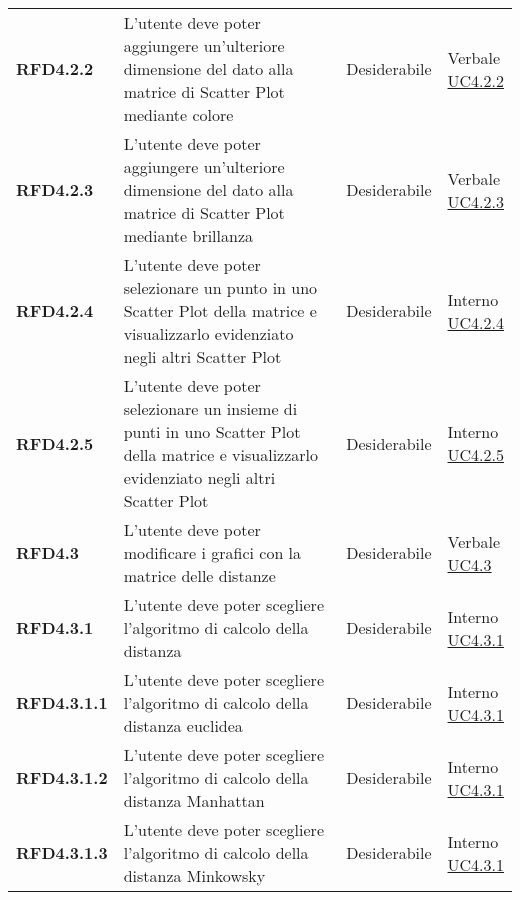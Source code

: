 \begin{longtable}[H]{| >{\raggedright\bfseries}m{20mm} | >{\raggedright}m{90mm} | >{\centering}m{25mm} | >{\centering\arraybackslash}m{30mm}|}
    RFD4.2.2
    & L'utente deve poter aggiungere un'ulteriore dimensione del dato alla matrice di Scatter Plot mediante colore
    & Desiderabile
    & \makecell{ Verbale \\ \hyperref[par:uc4.2.2]{UC4.2.2} }\\

    RFD4.2.3
    & L'utente deve poter aggiungere un'ulteriore dimensione del dato alla matrice di Scatter Plot mediante brillanza
    & Desiderabile
    & \makecell{ Verbale \\ \hyperref[par:uc4.2.3]{UC4.2.3} }\\

    RFD4.2.4
    & L'utente deve poter selezionare un punto in uno Scatter Plot della matrice e visualizzarlo evidenziato negli
    altri Scatter Plot
    & Desiderabile
    & \makecell{ Interno \\ \hyperref[par:uc4.2.4]{UC4.2.4} }\\

    RFD4.2.5
    & L'utente deve poter selezionare un insieme di punti in uno Scatter Plot della matrice e visualizzarlo evidenziato
    negli altri Scatter Plot
    & Desiderabile
    & \makecell{ Interno \\ \hyperref[par:uc4.2.5]{UC4.2.5} }\\

    RFD4.3
    & L'utente deve poter modificare i grafici con la matrice delle distanze
    & Desiderabile
    & \makecell{ Verbale \\ \hyperref[ssub:uc4.3]{UC4.3} }\\

    RFD4.3.1
    & L'utente deve poter scegliere l'algoritmo di calcolo della distanza
    & Desiderabile
    & \makecell{ Interno \\ \hyperref[par:uc4.3.1]{UC4.3.1} }\\

    RFD4.3.1.1
    & L'utente deve poter scegliere l'algoritmo di calcolo della distanza euclidea
    & Desiderabile
    & \makecell{ Interno \\ \hyperref[par:uc4.3.1]{UC4.3.1} }\\

    RFD4.3.1.2
    & L'utente deve poter scegliere l'algoritmo di calcolo della distanza Manhattan
    & Desiderabile
    & \makecell{ Interno \\ \hyperref[par:uc4.3.1]{UC4.3.1} }\\

    RFD4.3.1.3
    & L'utente deve poter scegliere l'algoritmo di calcolo della distanza Minkowsky
    & Desiderabile
    & \makecell{ Interno \\ \hyperref[par:uc4.3.1]{UC4.3.1} }\\


\end{longtable}
